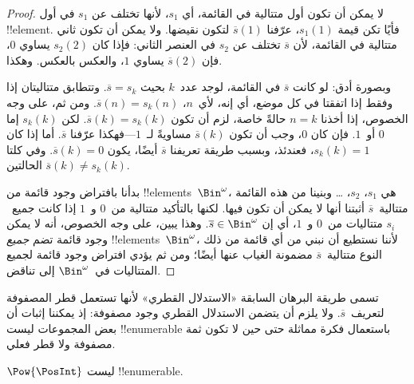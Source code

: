 \documentclass[../../../include/open-logic-section]{subfiles}
\begin{document}
\begin{proof}
لا يمكن أن تكون أول متتالية في القائمة، أي $s_1$، لأنها تختلف عن
$s_1$ في أول !!{element}. فأيًا تكن قيمة $s_1(1)$، عرّفنا
$\overline{s}(1)$ لتكون نقيضها. ولا يمكن أن تكون ثاني متتالية في
القائمة، لأن $\overline{s}$ تختلف عن $s_2$ في العنصر الثاني: فإذا
كان $s_2(2)$ يساوي $0$، فإن $\overline{s}(2)$ يساوي $1$، والعكس
بالعكس. وهكذا.

وبصورة أدق: لو كانت $\overline{s}$ في القائمة، لوجد عدد~$k$ بحيث
$\overline{s} = s_{k}$. وتتطابق متتاليتان إذا وفقط إذا اتفقتا في كل
موضع، أي إنه، لأي~$n$، $\overline{s}(n) =
s_{k}(n)$. ومن ثم، على وجه الخصوص، إذا أخذنا $n = k$ حالةً خاصة، لزم
أن تكون $\overline{s}(k) = s_{k}(k)$. لكن $s_k(k)$ إما $0$ أو~$1$.
فإن كان $0$، وجب أن تكون $\overline{s}(k)$ مساويةً لـ~$1$---فهكذا
عرّفنا $\overline{s}$. أما إذا كان $s_k(k) = 1$، فعندئذ، وبسبب طريقة
تعريفنا $\overline{s}$ أيضًا، يكون $\overline{s}(k) = 0$. وفي كلتا
الحالتين $\overline{s}(k) \neq s_{k}(k)$.

بدأنا بافتراض وجود قائمة من !!{element}s~$\Bin^\omega$، هي $s_1$،
$s_2$، \dots{} وبنينا من هذه القائمة متتالية~$\overline{s}$ أثبتنا
أنها لا يمكن أن تكون فيها. لكنها بالتأكيد متتالية من~$0$ و~$1$ إذا
كانت جميع~$s_i$ متتاليات من~$0$ و~$1$، أي إن $\overline{s} \in
\Bin^\omega$. وهذا يبين، على وجه الخصوص، أنه لا يمكن وجود قائمة تضم
\emph{جميع} !!{element}s~$\Bin^\omega$، لأننا نستطيع أن نبني من أي
قائمة من ذلك النوع متتالية~$\overline{s}$ مضمونة الغياب عنها أيضًا؛
ومن ثم يؤدي افتراض وجود قائمة لجميع المتتاليات في~$\Bin^\omega$ إلى
تناقض.
\end{proof}

\begin{explain}
تسمى طريقة البرهان السابقة «الاستدلال القطري» لأنها تستعمل قطر
المصفوفة لتعريف~$\overline{s}$. ولا يلزم أن يتضمن الاستدلال القطري
وجود مصفوفة: إذ يمكننا إثبات أن بعض المجموعات ليست !!{enumerable} باستعمال
فكرة مماثلة حتى حين لا تكون ثمة مصفوفة ولا قطر فعلي.
\end{explain}

\begin{thm}
$\Pow{\PosInt}$ ليست !!{enumerable}.
\end{thm}
\end{document}
